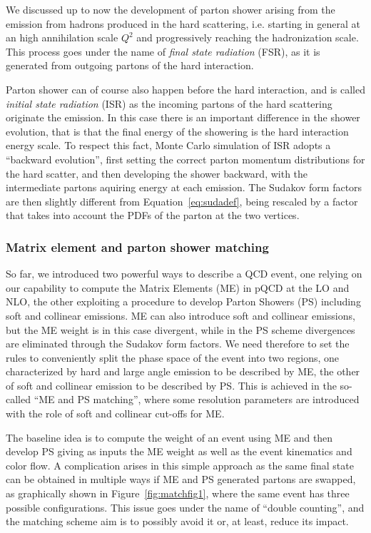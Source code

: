 We discussed up to now the development of parton shower arising
from the emission from hadrons produced in the hard scattering, i.e. 
starting in general at an high annihilation scale $Q^2$ and progressively
reaching the hadronization scale. This process goes under the name of
{\it final state radiation} (FSR), as it is generated from outgoing
partons of the hard interaction.

Parton shower can of course also happen before the hard interaction, and
is called {\it initial state radiation} (ISR) as the incoming partons
of the hard scattering originate the emission. In this case
there is an important difference in the shower evolution, that is
that the final energy of the showering is the hard interaction energy
scale. To respect this fact, Monte Carlo simulation of ISR adopts a 
``backward evolution'', first setting the correct parton momentum distributions
for the hard scatter, and then developing the shower backward, with the 
intermediate partons aquiring energy at each emission. The Sudakov form 
factors are then slightly different from Equation~\ref{eq:sudadef}, being
rescaled by a factor that takes into account the PDFs of the parton at the
two vertices.


\subsubsection{Matrix element and parton shower matching}\label{sec:matching}

So far, we introduced two powerful ways to describe a QCD event, one relying
on our capability to compute the Matrix Elements (ME) in pQCD at the LO and NLO,
the other exploiting a procedure to develop Parton Showers (PS) including
soft and collinear emissions. ME can also introduce soft and collinear emissions,
but the ME weight is in this case divergent, while in the PS scheme divergences
are eliminated through the Sudakov form factors. We need therefore to set 
the rules to conveniently split the phase space of the event into two regions,
one characterized by hard and large angle emission to be described by ME, the
other of soft and collinear emission to be described by PS. This is achieved
in the so-called ``ME and PS matching'', where some resolution parameters are
introduced with the role of soft and collinear cut-offs for ME. 

The baseline idea is to compute the weight of an event using ME and then
develop PS giving as inputs the ME weight as well as the event kinematics and 
color flow. A complication arises in this simple approach as the same final
state can be obtained in multiple ways if ME and PS generated partons are swapped,
as graphically shown in Figure~\ref{fig:matchfig1}, where the same event 
has three possible configurations. This issue goes under the name of ``double
counting'', and the matching scheme aim is to possibly avoid it or, at least, 
reduce its impact.

